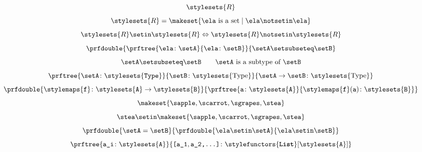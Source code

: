 \begin{forslides}
    \begin{equation}
        \label{eq:russel_session1_22}
        \stylesets{R}
    \end{equation}
    \begin{equation}
        \label{eq:russel_2_session1_22}
        \stylesets{R}=\makeset{\ela \text{ is a set}\mid \ela \notsetin \ela}
    \end{equation}
    \begin{equation}
        \label{eq:russel_3_session1_22}
        \stylesets{R} \setin \stylesets{R} \Leftrightarrow \stylesets{R} \notsetin \stylesets{R}
    \end{equation}
    \begin{equation}
        \label{eq:types_session1_22}
        \prfdouble{\prftree{\ela \colon \setA}{\ela \colon \setB}}{\setA \setsubseteq \setB}
    \end{equation}
    \begin{equation}
        \label{eq:types_2_session1_22}
        \setA \setsubseteq \setB \qquad \setA \text{ is a subtype of }\setB
    \end{equation}
    \begin{equation}
        \label{eq:types_3_session1_22}
        \prftree{\setA\colon \stylesets{\texttt{Type}}}{\setB\colon \stylesets{\text{Type}}}{{\setA\to \setB \colon \stylesets{\text{Type}}}}
    \end{equation}
    \begin{equation}
        \label{eq:types_4_session1_22}
        \prfdouble{\stylemaps{\texttt{f}}\colon \stylesets{\texttt{A}}\to \stylesets{\texttt{B}}}{\prftree{\texttt{a}\colon \stylesets{\texttt{A}}}{\stylemaps{\texttt{f}}(\texttt{a})\colon \stylesets{\texttt{B}}}}
    \end{equation}
    \begin{equation}
        \label{eq:1_session1_22}
        \makeset{\sapple,\scarrot,\sgrapes,\stea}
    \end{equation}
    \begin{equation}
        \label{eq:2_session1_22}
        \stea \setin \makeset{\sapple,\scarrot,\sgrapes,\stea}
    \end{equation}
    \begin{equation}
        \label{eq:3_session1_22}
        \prfdouble{\setA =\setB}{\prfdouble{\ela \setin \setA}{\ela\setin \setB}}
    \end{equation}
    \begin{equation}
        \label{eq:typecon_1_session1_22}
        \prftree{\texttt{a\_i}\colon \stylesets{\texttt{A}}}{\texttt{[a\_1},\texttt{a\_2,\ldots]}\colon \stylefunctors{\textbf{\texttt{List}}}[\stylesets{\texttt{A}}]}

\end{equation}
\end{forslides}
